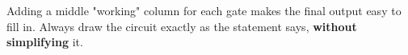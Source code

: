 \documentclass[11pt]{article}
\begin{document}
\begin{center}
\end{center}

Adding a middle "working" column for each gate makes the final output easy to fill in. Always draw the circuit exactly as the statement says, \textbf{without simplifying} it.
\end{document}
